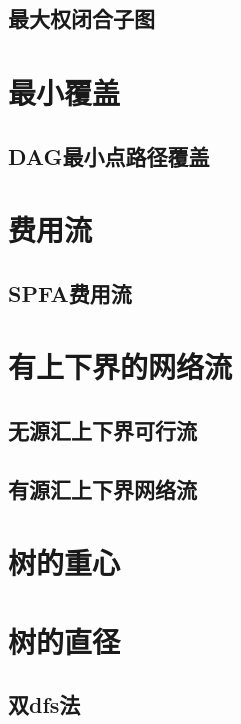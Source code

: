 \documentclass{probook}
\begin{document}
\subsection{最大权闭合子图}

\section{最小覆盖}
\subsection{DAG最小点路径覆盖}

\section{费用流}
\subsection{SPFA费用流}
 
\section{有上下界的网络流}
\subsection{无源汇上下界可行流}
 
\subsection{有源汇上下界网络流}
 
\section{树的重心}

\section{树的直径}
\subsection{双dfs法}

\end{document}
